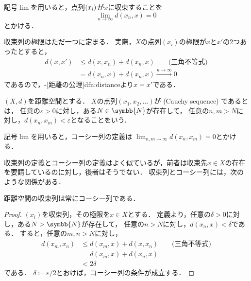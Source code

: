\documentclass[../sotsu.tex]{subfiles}
\begin{document}
記号$\lim$を用いると，点列$\sequ{x_i}$が$x$に収束することを
\[  \lim_{n \to \infty} d(x_n, x) = 0  \]
とかける．

収束列の極限はただ一つに定まる．
実際，$X$の点列$(x_i)$の極限が$x$と$x'$の2つあったとすると，
\begin{equation*}
    \begin{split}
        d(x, x') &\leq d(x, x_n) + d(x_n, x)  \qquad \text{(三角不等式)}  \\
            &= d(x_n, x) + d(x_n, x)  
            \xrightarrow{n \to \infty} 0
    \end{split}
\end{equation*}
であるので，-[距離の公理]{dfn:distance}より$x = x'$である．


\begin{definition}[コーシー列]
    \label{dfn:Cauchy-sequence}
    $(X, d)$を距離空間とする．
    $X$の点列$(x_1, x_2, \dotsc)$が
    (Cauchy sequence)%
    であるとは，
    任意の$\varepsilon > 0$に対し，ある$N \in \symbb{N}$が存在して，
    任意の$n, m > N$に対し，$ d(x_n, x_m) < \varepsilon $となることをいう\cite{uchida-set-2020}．
\end{definition}

記号$\lim$を用いると，コーシー列の定義は
$\lim_{n, m \to \infty} d(x_n, x_m) = 0$とかける．

収束列の定義とコーシー列の定義はよく似ているが，前者は収束先$x \in X$の存在を要請しているのに対し，後者はそうでない．
収束列とコーシー列には，次のような関係がある．
\begin{theorem}
    \label{thm:convergent-is-Cauchy}
    距離空間の収束列は常にコーシー列である．
\end{theorem}

\begin{proof}
    $(x_i)$を収束列，その極限を$x \in X$とする．
    定義より，任意の$\delta > 0$に対し，ある$N > \symbb{N}$が存在して，
    任意の$n > N$に対し，$d(x_n, x) < \delta$である．
    すると，任意の$m, n > N$に対し，
    \begin{equation*}
        \begin{split}
            d(x_m, x_n) &\leq d(x_m, x) + d(x, x_n)  \qquad \text{(三角不等式)}  \\
                &= d(x_m, x) + d(x_n, x)  \\
                &< 2\delta
        \end{split}
    \end{equation*}
    である．
    $\delta \coloneq \varepsilon/2$とおけば，コーシー列の条件が成立する．
\end{proof}
\end{document}
